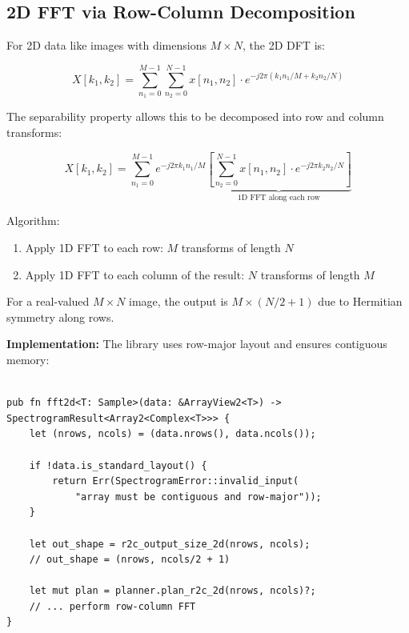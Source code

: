 \subsection{2D FFT via Row-Column Decomposition}\label{subsec:fft2d}

For 2D data like images with dimensions $M \times N$, the 2D DFT is:

\begin{equation}
  \label{eq:dft_2d}
  X[k_1, k_2] = \sum_{n_1=0}^{M-1} \sum_{n_2=0}^{N-1} x[n_1, n_2]
  \cdot e^{-j2\pi(k_1 n_1/M + k_2 n_2/N)}
\end{equation}

The separability property allows this to be decomposed into row and
column transforms:

\begin{equation}
  \label{eq:fft_2d_decomposition}
  X[k_1, k_2] = \sum_{n_1=0}^{M-1} e^{-j2\pi k_1 n_1/M}
  \underbrace{\left[\sum_{n_2=0}^{N-1} x[n_1, n_2] \cdot e^{-j2\pi k_2
  n_2/N}\right]}_{\text{1D FFT along each row}}
\end{equation}

Algorithm:
\begin{enumerate}
  \item Apply 1D FFT to each row: $M$ transforms of length $N$
  \item Apply 1D FFT to each column of the result: $N$ transforms of length $M$
\end{enumerate}

For a real-valued $M \times N$ image, the output is $M \times (N/2 +
1)$ due to Hermitian symmetry along rows.

\textbf{Implementation:} The library uses row-major layout and
ensures contiguous memory:

\begin{lstlisting}[caption={2D FFT function signature and output shape}]

pub fn fft2d<T: Sample>(data: &ArrayView2<T>) -> SpectrogramResult<Array2<Complex<T>>> {
    let (nrows, ncols) = (data.nrows(), data.ncols());

    if !data.is_standard_layout() {
        return Err(SpectrogramError::invalid_input(
            "array must be contiguous and row-major"));
    }

    let out_shape = r2c_output_size_2d(nrows, ncols);
    // out_shape = (nrows, ncols/2 + 1)

    let mut plan = planner.plan_r2c_2d(nrows, ncols)?;
    // ... perform row-column FFT
}
\end{lstlisting}

